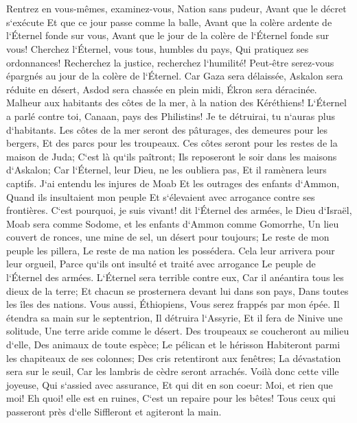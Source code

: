 \chapter{}

\verse Rentrez en vous-mêmes, examinez-vous, Nation sans pudeur, 
\verse Avant que le décret s`exécute Et que ce jour passe comme la balle, Avant que la colère ardente de l`Éternel fonde sur vous, Avant que le jour de la colère de l`Éternel fonde sur vous! 
\verse Cherchez l`Éternel, vous tous, humbles du pays, Qui pratiquez ses ordonnances! Recherchez la justice, recherchez l`humilité! Peut-être serez-vous épargnés au jour de la colère de l`Éternel. 
\verse Car Gaza sera délaissée, Askalon sera réduite en désert, Asdod sera chassée en plein midi, Ékron sera déracinée. 
\verse Malheur aux habitants des côtes de la mer, à la nation des Kéréthiens! L`Éternel a parlé contre toi, Canaan, pays des Philistins! Je te détruirai, tu n`auras plus d`habitants. 
\verse Les côtes de la mer seront des pâturages, des demeures pour les bergers, Et des parcs pour les troupeaux. 
\verse Ces côtes seront pour les restes de la maison de Juda; C`est là qu`ils paîtront; Ils reposeront le soir dans les maisons d`Askalon; Car l`Éternel, leur Dieu, ne les oubliera pas, Et il ramènera leurs captifs. 
\verse J`ai entendu les injures de Moab Et les outrages des enfants d`Ammon, Quand ils insultaient mon peuple Et s`élevaient avec arrogance contre ses frontières. 
\verse C`est pourquoi, je suis vivant! dit l`Éternel des armées, le Dieu d`Israël, Moab sera comme Sodome, et les enfants d`Ammon comme Gomorrhe, Un lieu couvert de ronces, une mine de sel, un désert pour toujours; Le reste de mon peuple les pillera, Le reste de ma nation les possédera. 
\verse Cela leur arrivera pour leur orgueil, Parce qu`ils ont insulté et traité avec arrogance Le peuple de l`Éternel des armées. 
\verse L`Éternel sera terrible contre eux, Car il anéantira tous les dieux de la terre; Et chacun se prosternera devant lui dans son pays, Dans toutes les îles des nations. 
\verse Vous aussi, Éthiopiens, Vous serez frappés par mon épée. 
\verse Il étendra sa main sur le septentrion, Il détruira l`Assyrie, Et il fera de Ninive une solitude, Une terre aride comme le désert. 
\verse Des troupeaux se coucheront au milieu d`elle, Des animaux de toute espèce; Le pélican et le hérisson Habiteront parmi les chapiteaux de ses colonnes; Des cris retentiront aux fenêtres; La dévastation sera sur le seuil, Car les lambris de cèdre seront arrachés. 
\verse Voilà donc cette ville joyeuse, Qui s`assied avec assurance, Et qui dit en son coeur: Moi, et rien que moi! Eh quoi! elle est en ruines, C`est un repaire pour les bêtes! Tous ceux qui passeront près d`elle Siffleront et agiteront la main. 

